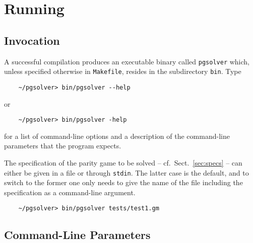 \section{Running \pgsolver}

\subsection{Invocation}

A successful compilation produces an executable binary called \texttt{pgsolver} which, unless
specified otherwise in \texttt{Makefile}, resides in the subdirectory \texttt{bin}. Type
\begin{verbatim}
    ~/pgsolver> bin/pgsolver --help
\end{verbatim}
or
\begin{verbatim}
    ~/pgsolver> bin/pgsolver -help
\end{verbatim}
for a list of command-line options and a description of the command-line parameters that the
program expects.

The specification of the parity game to be solved -- cf.\ Sect.~\ref{sec:specs} -- can either be
given in a file or through \texttt{stdin}. The latter case is the default, and to switch to the
former one only needs to give the name of the file including the specification as a command-line
argument.
\begin{verbatim}
    ~/pgsolver> bin/pgsolver tests/test1.gm
\end{verbatim}

\subsection{Command-Line Parameters}

